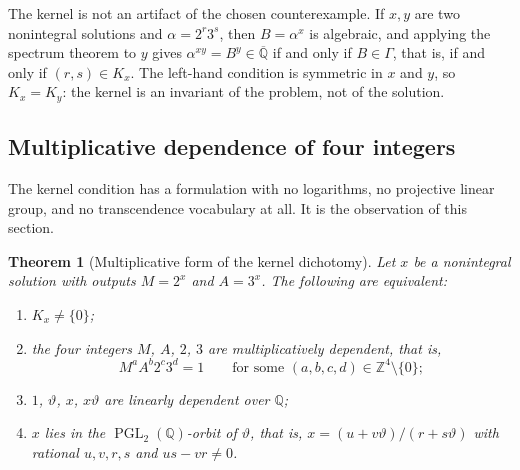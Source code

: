 \documentclass[11pt,oneside]{article}
\newtheorem{theorem}{Theorem}[section]
\theoremstyle{definition}
\theoremstyle{remark}
\newcommand{\Z}{\mathbb Z}
\newcommand{\Q}{\mathbb Q}
\newcommand{\Abar}{\overline{\mathbb Q}}
\newcommand{\thetaq}{\vartheta}
\newcommand{\GammaSat}{\Gamma}
\newcommand{\PGL}{\operatorname{PGL}}
\newcommand{\Qbar}{\Abar}
\begin{document}
The kernel is not an artifact of the chosen counterexample.  If $x,y$ are two nonintegral
solutions and $\alpha=2^r3^s$, then $B=\alpha^{x}$ is algebraic, and applying the spectrum
theorem to $y$ gives $\alpha^{xy}=B^{y}\in\Qbar$ if and only if $B\in\GammaSat$, that is, if
and only if $(r,s)\in K_x$.  The left-hand condition is symmetric in $x$ and $y$, so
$K_x=K_y$: the kernel is an invariant of the problem, not of the solution.

\subsection{Multiplicative dependence of four integers}

The kernel condition has a formulation with no logarithms, no projective linear group, and no
transcendence vocabulary at all.  It is the observation of this section.

\begin{theorem}[Multiplicative form of the kernel dichotomy]
\label{kn:thm-multiplicative}
Let $x$ be a nonintegral solution with outputs $M=2^x$ and $A=3^x$.  The following are
equivalent:
\begin{enumerate}[label=\textup{(\roman*)}]
\item $K_x\ne\{0\}$;
\item the four integers $M$, $A$, $2$, $3$ are multiplicatively dependent, that is,
      \[
        M^{a}A^{b}2^{c}3^{d}=1
        \qquad\text{for some }(a,b,c,d)\in\Z^4\setminus\{0\};
      \]
\item $1$, $\thetaq$, $x$, $x\thetaq$ are linearly dependent over $\Q$;
\item $x$ lies in the $\PGL_2(\Q)$-orbit of $\thetaq$, that is,
      $x=(u+v\thetaq)/(r+s\thetaq)$ with rational $u,v,r,s$ and $us-vr\ne0$.
\end{enumerate}
\end{theorem}
\end{document}
